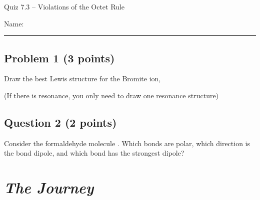 \documentclass[11pt, letterpaper]{memoir}
\begin{document}
\begin{center}
	{\large	Quiz 7.3 -- Violations of the Octet Rule}
\end{center}
{\large Name: \rule[-1mm]{4in}{.1pt}

\subsection*{Problem 1 (3 points)}
Draw the best Lewis structure for the Bromite ion, 

\noindent(If there is resonance, you only need to draw one resonance structure)

\vspace{18em}
\subsection*{Question 2 (2 points)}
Consider the formaldehyde molecule . Which bonds are polar, which direction is the bond dipole, and which bond has the strongest dipole?



\newpage
\pagestyle{empty}
\addtocounter{page}{-1}
\section*{\emph{The Journey}}
}
\end{document}
